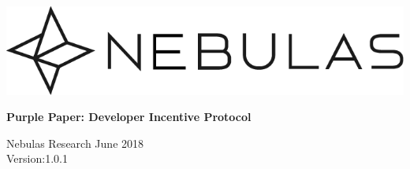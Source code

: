 \documentclass[12pt]{article}
\begin{document}
\pagestyle{empty}

\pagecolor{\pcolor}

\begin{titlepage}
  \begin{center}
    \vspace*{5.5cm}
    \includegraphics[scale=0.5]{../common/Nebulas.png}
    \vspace{0.5cm}


    \textbf{\huge{Purple Paper: Developer Incentive Protocol}}

    \vspace{0.5cm}
    Nebulas Research
    \vfill
    June 2018\\
    Version:1.0.1
    \textbf{}
  \end{center}

\end{titlepage}
\setcounter{page}{0}
\tableofcontents
\newpage
\setcounter{page}{1}
\pagestyle{fancy}
\vspace*{0.01cm}
%




%


\newpage
\begin{appendices}

%
\end{appendices}
\end{document}
